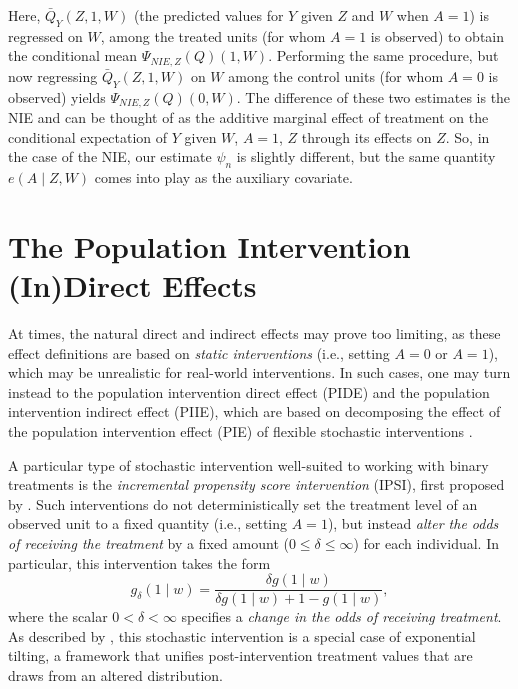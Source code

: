 \documentclass[12pt, krantz2,]{krantz}
\theoremstyle{definition}
\theoremstyle{definition}
\theoremstyle{definition}
\newcommand{\1}{\mathbbm{1}}
\begin{document}
Here, \(\bar{Q}_Y(Z, 1, W)\) (the predicted values for \(Y\) given \(Z\) and \(W\) when
\(A = 1\)) is regressed on \(W\), among the treated units (for whom \(A = 1\) is
observed) to obtain the conditional mean \(\Psi_{NIE, Z}(Q)(1, W)\). Performing
the same procedure, but now regressing \(\bar{Q}_Y(Z, 1, W)\) on \(W\) among the
control units (for whom \(A = 0\) is observed) yields \(\Psi_{NIE,Z}(Q)(0, W)\). The
difference of these two estimates is the NIE and can be thought of as the
additive marginal effect of treatment on the conditional expectation of \(Y\)
given \(W\), \(A = 1\), \(Z\) through its effects on \(Z\). So, in the case of the NIE,
our estimate \(\psi_n\) is slightly different, but the same quantity \(e(A \mid Z, W)\) comes into play as the auxiliary covariate.

\hypertarget{the-population-intervention-indirect-effects}{%
\section{The Population Intervention (In)Direct Effects}\label{the-population-intervention-indirect-effects}}

At times, the natural direct and indirect effects may prove too limiting, as
these effect definitions are based on \emph{static interventions} (i.e., setting
\(A = 0\) or \(A = 1\)), which may be unrealistic for real-world interventions. In
such cases, one may turn instead to the population intervention direct effect
(PIDE) and the population intervention indirect effect (PIIE), which are based
on decomposing the effect of the population intervention effect (PIE) of
flexible stochastic interventions \citep{diaz2020causal}.

A particular type of stochastic intervention well-suited to working with binary
treatments is the \emph{incremental propensity score intervention} (IPSI), first
proposed by \citet{kennedy2017nonparametric}. Such interventions do not
deterministically set the treatment level of an observed unit to a fixed
quantity (i.e., setting \(A = 1\)), but instead \emph{alter the odds of receiving the
treatment} by a fixed amount (\(0 \leq \delta \leq \infty\)) for each individual.
In particular, this intervention takes the form
\begin{equation*}
  g_{\delta}(1 \mid w) = \frac{\delta g(1 \mid w)}{\delta g(1 \mid w) + 1
  - g(1\mid w)},
\end{equation*}
where the scalar \(0 < \delta < \infty\) specifies a \emph{change in the odds of
receiving treatment}. As described by \citet{diaz2020causal}, this stochastic
intervention is a special case of exponential tilting, a framework that unifies
post-intervention treatment values that are draws from an altered distribution.
\end{document}
